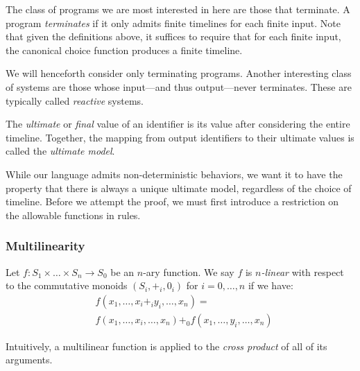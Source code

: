 The class of programs we are most interested in here are those that terminate.  A program {\em terminates} if it only admits finite timelines for each finite input.  Note that given the definitions above, it suffices to require that for each finite input, the canonical choice function produces a finite timeline.

We will henceforth consider only terminating programs. Another interesting class of systems are those whose input---and thus output---never terminates.  These are typically called {\em reactive} systems.

The {\em ultimate} or {\em final} value of an identifier is its value after considering the entire timeline.  Together, the mapping from output identifiers to their ultimate values is called the {\em ultimate model}.

While our language admits non-deterministic behaviors, we want it to have the property that there is always a unique ultimate model, regardless of the choice of timeline.  Before we attempt the proof, we must first introduce a restriction on the allowable functions in rules.


\subsubsection{Multilinearity}

Let $f : S_1 \times \ldots \times S_n \rightarrow S_0$ be an $n$-ary function.  We say $f$ is {\em $n$-linear} with respect to the commutative monoids $(S_i, +_i, 0_i)$ for $i = 0, \ldots, n$ if we have:
\begin{eqnarray*}
& f(x_1, \ldots, x_i +_i y_i, \ldots, x_n) = \\
& f(x_1, \ldots, x_i, \ldots, x_n) +_0 f(x_1, \ldots, y_i, \ldots, x_n)
\end{eqnarray*}

Intuitively, a multilinear function is applied to the {\em cross product} of all of its arguments.

